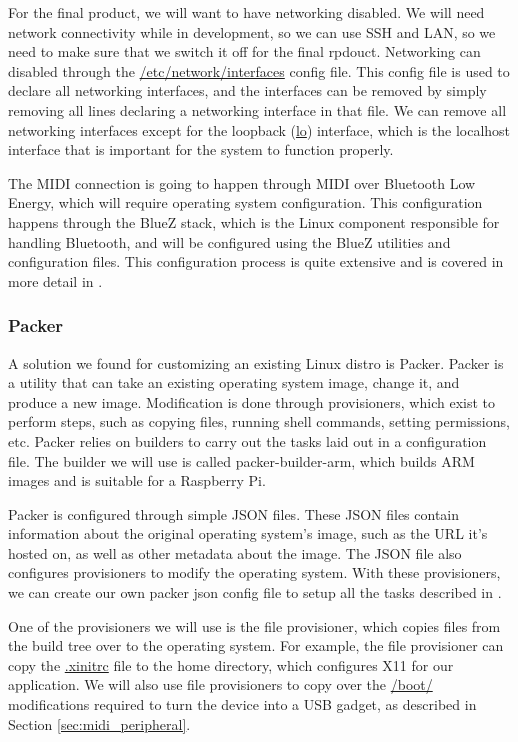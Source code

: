 For the final product, we will want to have networking disabled. We will need network
connectivity while in development, so we can use SSH and LAN, so we need to make sure that
we switch it off for the final rpdouct. Networking can disabled through the
\url{/etc/network/interfaces} config file. This config file is used to declare all
networking interfaces, and the interfaces can be removed by simply removing all lines
declaring a networking interface in that file. We can remove all networking interfaces
except for the loopback (\url{lo}) interface, which is the localhost interface that is
important for the system to function properly.

The MIDI connection is going to happen through MIDI over Bluetooth Low Energy, which will
require operating system configuration. This configuration happens through the BlueZ
stack, which is the Linux component responsible for handling Bluetooth, and will be
configured using the BlueZ utilities and configuration files. This configuration process
is quite extensive and is covered in more detail in .

\subsubsection{Packer}
\label{sec:packer}

A solution we found for customizing an existing Linux distro is Packer. Packer is a
utility that can take an existing operating system image, change it, and produce a new
image. Modification is done through provisioners, which exist to perform steps, such as
copying files, running shell commands, setting permissions, etc. Packer relies on builders
to carry out the tasks laid out in a configuration file. The builder we will use is called
packer-builder-arm, which builds ARM images and is suitable for a Raspberry Pi.

Packer is configured through simple JSON files. These JSON files contain information about
the original operating system's image, such as the URL it's hosted on, as well as other
metadata about the image. The JSON file also configures provisioners to modify the
operating system. With these provisioners, we can create our own packer json config file to
setup all the tasks described in .

One of the provisioners we will use is the file provisioner, which copies files from the
build tree over to the operating system. For example, the file provisioner can copy the
\url{.xinitrc} file to the home directory, which configures X11 for our application.
We will also use file provisioners to copy over the \url{/boot/} modifications required to
turn the device into a USB gadget, as described in Section \ref{sec:midi_peripheral}.

